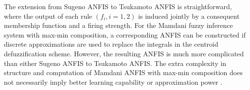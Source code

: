 The extension from Sugeno ANFIS to Tsukamoto ANFIS is straightforward, where the output of each rule $(f_i, i = 1,2)$ is induced jointly by a consequent membership function and a firing strength. For the Mamdani fuzzy inference system with max-min composition, a corresponding ANFIS can be constructed if discrete approximations are used to replace the integrals in the centroid defuzzification scheme. However, the resulting ANFIS is much more complicated than either Sugeno ANFIS to Tsukamoto ANFIS. The extra complexity in structure and computation of Mamdani ANFIS with max-min composition does not necessarily imply better learning capability or approximation power \cite{jang1997neuro}.

\pagebreak